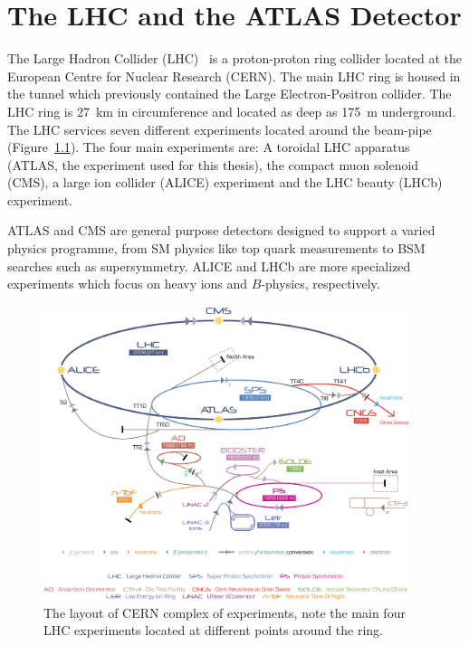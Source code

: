 \newcommand{\rphi}{\ensuremath{R\textrm{-}\phi}}
\newcommand{\T}{\ensuremath{\mathbf{T}}}
\newcommand{\Tms}{\ensuremath{\T_{\textrm{MS}}}}
\newcommand{\Tid}{\ensuremath{\T_{\textrm{ID}}}}
\newcommand{\C}{\ensuremath{\mathbf{C}}}
\newcommand{\Cms}{\ensuremath{\C_{\textrm{MS}}}}
\newcommand{\Cid}{\ensuremath{\C_{\textrm{ID}}}}
\newcommand{\kt}{\ensuremath{k_{\textrm{T}}}}
\newcommand{\kti}{\ensuremath{k_{\textrm{T},i}}}
\newcommand{\ktj}{\ensuremath{k_{\textrm{T},j}}}
\newcommand{\dij}{\ensuremath{\Delta_{ij}}}

\chapter{The LHC and the ATLAS Detector} \label{ch:Detector}

The Large Hadron Collider (LHC)~\cite{LHC} is a proton-proton ring collider located at the European Centre for Nuclear Research (CERN). The main LHC ring is housed in the tunnel which previously contained the Large Electron-Positron collider. The LHC ring is \SI{27}{\kilo\meter} in circumference and located as deep as \SI{175}{\meter} underground. The LHC services seven different experiments located around the beam-pipe (Figure~\ref{fig:DetectorLHCLayout}). The four main experiments are: A toroidal LHC apparatus (ATLAS, the experiment used for this thesis), the compact muon solenoid (CMS), a large ion collider (ALICE) experiment and the LHC beauty (LHCb) experiment. 

ATLAS and CMS are general purpose detectors designed to support a varied physics programme, from SM physics like top quark measurements to BSM searches such as supersymmetry. ALICE and LHCb are more specialized experiments which focus on heavy ions and $B$-physics, respectively.

\begin{figure}[htbp]
  \centering
    \includegraphics[width=0.95\textwidth]{PartDetector/Diagrams/Cern-Accelerator-Complex.jpg}
    \caption{The layout of CERN complex of experiments, note the main four LHC experiments located at different points around the ring.}
  \label{fig:DetectorLHCLayout}
\end{figure}

